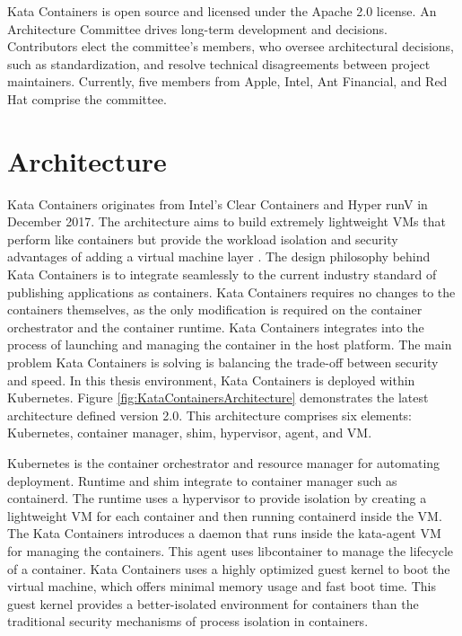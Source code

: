Kata Containers is open source and licensed under the Apache 2.0 license. An Architecture Committee drives long-term development and decisions. Contributors elect the committee's members, who oversee architectural decisions, such as standardization, and resolve technical disagreements between project maintainers. Currently, five members from Apple, Intel, Ant Financial, and Red Hat comprise the committee. \cite{KataContainers}\cite{KataContainersGovernance}

\section{Architecture}

Kata Containers originates from Intel's Clear Containers \cite{ClearContainers} and Hyper runV \cite{runV} in December 2017. The architecture aims to build extremely lightweight VMs that perform like containers but provide the workload isolation and security advantages of adding a virtual machine layer \cite{Randazzo2019}. The design philosophy behind Kata Containers is to integrate seamlessly to the current industry standard of publishing applications as containers. Kata Containers requires no changes to the containers themselves, as the only modification is required on the container orchestrator and the container runtime. Kata Containers integrates into the process of launching and managing the container in the host platform. The main problem Kata Containers is solving is balancing the trade-off between security and speed. In this thesis environment, Kata Containers is deployed within Kubernetes. Figure \ref{fig:KataContainersArchitecture} demonstrates the latest architecture defined version 2.0. This architecture comprises six elements: Kubernetes, container manager, shim, hypervisor, agent, and VM. 

Kubernetes is the container orchestrator and resource manager for automating deployment. Runtime and shim integrate to container manager such as containerd. The runtime uses a hypervisor to provide isolation by creating a lightweight VM for each container and then running containerd inside the VM. The Kata Containers introduces a daemon that runs inside the kata-agent VM for managing the containers. This agent uses libcontainer to manage the lifecycle of a container. Kata Containers uses a highly optimized guest kernel to boot the virtual machine, which offers minimal memory usage and fast boot time. This guest kernel provides a better-isolated environment for containers than the traditional security mechanisms of process isolation in containers. \cite{Kumar2020}

